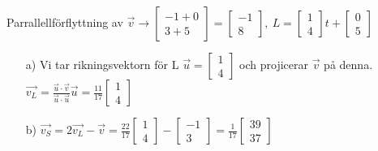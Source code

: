 Parrallellförflyttning av $\vec{v} \to \begin{bmatrix}-1+0 \\ 3+5\end{bmatrix}=\begin{bmatrix}-1 \\ 8\end{bmatrix},\ L=\begin{bmatrix}1 \\ 4\end{bmatrix}t+\begin{bmatrix}0 \\ 5\end{bmatrix}$
\begin{itemize}
\item[a) ] Vi tar rikningsvektorn för L $\vec{u}=\begin{bmatrix}1 \\ 4\end{bmatrix}$ och projicerar $\vec{v}$ på denna. $\vec{v_{L}}=\frac{\vec{u}\cdot\vec{v}}{\vec{u}\cdot\vec{u}}\vec{u}=\frac{11}{17}\begin{bmatrix}1 \\ 4 \end{bmatrix}$
\item[b) ] $\vec{v_{S}}=2\vec{v_{L}}-\vec{v}= \frac{22}{17}\begin{bmatrix}1 \\ 4 \end{bmatrix}- \begin{bmatrix}-1 \\ 3 \end{bmatrix} =\frac{1}{17} \begin{bmatrix} 39 \\ 37\end{bmatrix}$
\end{itemize}